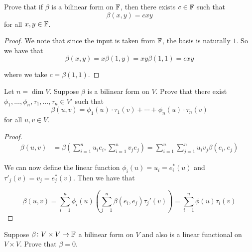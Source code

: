 \documentclass{extarticle}
\begin{document}

\newpage 
{}


\begin{problem}{1}
    Prove that if \(\beta\) is a bilinear form on \(\mathbb{F}\), then there exists \(c \in \mathbb{F}\) such that 
    \[\beta (x, y) = c xy\]
    for all \(x, y \in \mathbb{F}\).
\end{problem}

\begin{proof}
We note that since the input is taken from \(\mathbb{F}\), the basis is naturally \(1\). So we have that 
\[\beta(x, y) = x \beta(1, y) = xy \beta(1,1) = c xy\]

where we take \(c = \beta(1,1)\). 
\end{proof}


\begin{problem}{2}
    Let \(n = \dim V\). Suppose \(\beta\) is a bilinear form on \(V\). Prove that there exist 
    \(\phi_1, \ldots, \phi_n, \tau_1, \ldots, \tau_n \in V'\) such that 
    \[\beta(u, v) = \phi_1(u) \cdot \tau_1(v) + \cdots + \phi_n (u) \cdot \tau_n (v)\]
    for all \(u, v \in V\). 
\end{problem}

\begin{proof}
\begin{align*}
    \beta(u, v) 
    & = \beta (\sum_{i=1}^{n} u_i e_i, \sum_{i=1}^{n} v_je_j) 
    = \sum_{i=1}^{n} \sum_{j=1}^{n} u_i v_j \beta(e_i, e_j)
\end{align*}

We can now define the linear function \(\phi_i (u) = u_i = e_i^*(u)\) and 
\(\tau'_j(v) = v_j = e_j^*(v)\). Then we have that 

\[\beta(u, v) = \sum_{i=1}^{n} \phi_i(u) \left( \sum_{j=1}^{n} \beta(e_i, e_j) \tau_j'(v) \right) 
= \sum_{i=1}^{n} \phi(u) \tau_i(v)\]
\end{proof}


\begin{problem}{3}
    Suppose \(\beta \colon V \times V \to \mathbb{F}\) a bilinear form on \(V\) and also is a linear functional 
    on \(V \times V\). Prove that \(\beta = 0\).
\end{problem}
\end{document}
